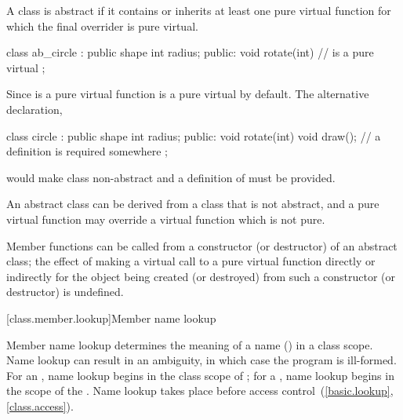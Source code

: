 \pnum
{}%
A class is abstract if it contains or inherits at least one pure virtual
function for which the final overrider is pure virtual.
\begin{example}
\begin{codeblock}
class ab_circle : public shape {
  int radius;
public:
  void rotate(int) { }
  //  is a pure virtual
};
\end{codeblock}

Since  is a pure virtual function
 is a pure virtual by default. The alternative
declaration,
\begin{codeblock}
class circle : public shape {
  int radius;
public:
  void rotate(int) { }
  void draw();                  // a definition is required somewhere
};
\end{codeblock}
would make class  non-abstract and a definition of
 must be provided.
\end{example}

\pnum
\begin{note}
An abstract class can be derived from a class that is not abstract, and
a pure virtual function may override a virtual function which is not
pure.
\end{note}

\pnum
{}%
Member functions can be called from a constructor (or destructor) of an
abstract class;
%
the effect of making a virtual call to a pure
virtual function directly or indirectly for the object being created (or
destroyed) from such a constructor (or destructor) is undefined.%

[class.member.lookup]{Member name lookup}%
%
%

\pnum
Member name lookup determines the meaning of a name
() in a class scope.
Name lookup can result in an ambiguity, in which case the
program is ill-formed. For an , name lookup
begins in the class scope of ; for a
, name lookup begins in the scope of the
. Name lookup takes place before access
control~(\ref{basic.lookup}, \ref{class.access}).

